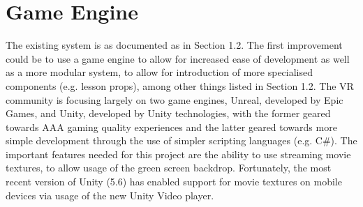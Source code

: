 \documentclass[11pt]{report}
\begin{document}
\section{Game Engine}
The existing system is as documented as in Section 1.2. The first improvement could be to use a game engine to allow for increased ease of development as well as a more modular system, to allow for introduction of more specialised components (e.g. lesson props), among other things listed in Section 1.2. The VR community is focusing largely on two game engines, Unreal, developed by Epic Games, and Unity, developed by Unity technologies, with the former geared towards AAA gaming quality experiences and the latter geared towards more simple development through the use of simpler scripting languages (e.g. C\#). The important features needed for this project are the ability to use streaming movie textures, to allow usage of the green screen backdrop. Fortunately, the most recent version of Unity (5.6) has enabled support for movie textures on mobile devices via usage of the new Unity Video player.
\end{document}

